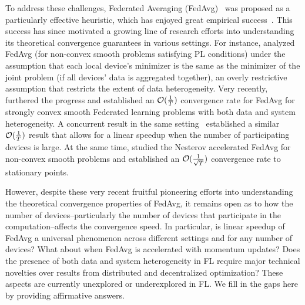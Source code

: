 To address these challenges, Federated Averaging (FedAvg)~\cite{mcmahan2016communication} was proposed as a particularly effective heuristic, which has enjoyed great empirical success~\cite{47586}. This success has since motivated a growing line of research efforts into understanding its theoretical convergence guarantees in various settings. For instance, \cite{haddadpour2019convergence} analyzed FedAvg (for non-convex smooth problems satisfying PL conditions) under the assumption that each local device's minimizer is the same as the minimizer of the joint problem (if all devices' data is aggregated together), an overly restrictive assumption that restricts the extent of data heterogeneity.
Very recently, \cite{li2019convergence} furthered the progress and established an ${\mathcal{O}}(\frac{1}{T})$ convergence rate for FedAvg for strongly convex smooth Federated learning problems with both data and system heterogeneity. A concurrent result in the same setting~\cite{karimireddy2019scaffold} established a similar ${\mathcal{O}}(\frac{1}{T})$ result that allows for a linear speedup when the number of participating devices is large.
At the same time, \cite{huo2020faster} studied the Nesterov accelerated FedAvg for non-convex smooth problems and established 
an ${\mathcal{O}}(\frac{1}{\sqrt{T}})$ convergence rate to stationary points. 


However, despite these very recent fruitful pioneering efforts into understanding the theoretical convergence properties of FedAvg, it remains open as to how the number of devices--particularly the number of devices that participate in the computation--affects the convergence speed.
In particular, is linear speedup of FedAvg a universal phenomenon across different settings and for any number of devices? What about when FedAvg is accelerated with momentum updates? Does the presence of both data and system heterogeneity in FL require major technical novelties over results from distributed and decentralized optimization? These aspects are currently unexplored or underexplored in FL. We fill in the gaps here by providing affirmative answers.

